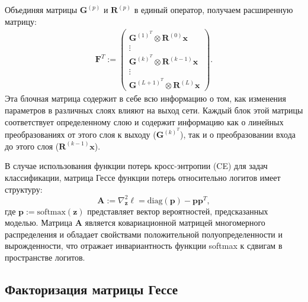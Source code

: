 Объединяя матрицы $\mathbf{G}^{(p)}$ и $\mathbf{R}^{(p)}$ в единый оператор, получаем расширенную матрицу:
\begin{align}
\mathbf{F}^T := 
    \begin{pmatrix}
        \mathbf{G}^{(1)^T} \otimes \mathbf{R}^{(0)}\mathbf{x} \\
        \vdots \\
        \mathbf{G}^{(k)^T} \otimes \mathbf{R}^{(k-1)}\mathbf{x} \\
        \vdots \\
        \mathbf{G}^{(L+1)^T} \otimes \mathbf{R}^{(L)}\mathbf{x}
    \end{pmatrix}.
\end{align}
Эта блочная матрица содержит в себе всю информацию о том, как изменения параметров в различных слоях влияют на выход сети.
Каждый блок этой матрицы соответствует определенному слою и содержит информацию как о линейных преобразованиях от этого слоя к выходу ($\mathbf{G}^{(k)^T}$), так и о преобразовании входа до этого слоя ($\mathbf{R}^{(k-1)}\mathbf{x}$).

В случае использования функции потерь кросс-энтропии (CE) для задач классификации, матрица Гессе функции потерь относительно логитов имеет структуру:
\[
    \mathbf{A} := \nabla^2_{\mathbf{z}} \ell = \mathrm{diag}(\mathbf{p}) - \mathbf{p}\mathbf{p}^T,
\]
где $\mathbf{p} := \mathrm{softmax}(\mathbf{z})$ представляет вектор вероятностей, предсказанных моделью.
Матрица $\mathbf{A}$ является ковариационной матрицей многомерного распределения и обладает свойствами положительной полуопределенности и вырожденности, что отражает инвариантность функции softmax к сдвигам в пространстве логитов.

\subsection{Факторизация матрицы Гессе}

